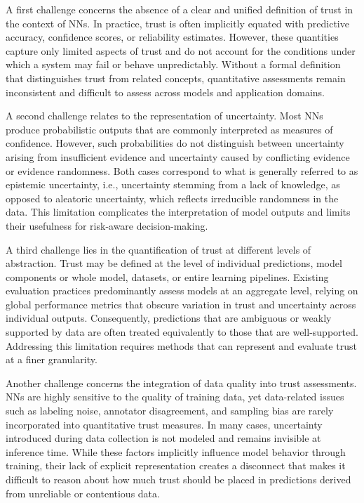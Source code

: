 A first challenge concerns the absence of a clear and unified definition of trust in the context of \acp{NN}. In practice, trust is often implicitly equated with predictive accuracy, confidence scores, or reliability estimates. However, these quantities capture only limited aspects of trust and do not account for the conditions under which a system may fail or behave unpredictably. Without a formal definition that distinguishes trust from related concepts, quantitative assessments remain inconsistent and difficult to assess across models and application domains.

A second challenge relates to the representation of uncertainty. Most \acp{NN} produce probabilistic outputs that are commonly interpreted as measures of confidence. However, such probabilities do not distinguish between uncertainty arising from insufficient evidence and uncertainty caused by conflicting evidence or evidence randomness. Both cases correspond to what is generally referred to as epistemic uncertainty, i.e., uncertainty stemming from a lack of knowledge, as opposed to aleatoric uncertainty, which reflects irreducible randomness in the data. This limitation complicates the interpretation of model outputs and limits their usefulness for risk-aware decision-making.

A third challenge lies in the quantification of trust at different levels of abstraction. Trust may be defined at the level of individual predictions, model components or whole model, datasets, or entire learning pipelines. Existing evaluation practices predominantly assess models at an aggregate level, relying on global performance metrics that obscure variation in trust and uncertainty across individual outputs. Consequently, predictions that are ambiguous or weakly supported by data are often treated equivalently to those that are well-supported. Addressing this limitation requires methods that can represent and evaluate trust at a finer granularity.

Another challenge concerns the integration of data quality into trust assessments. \acp{NN} are highly sensitive to the quality of training data, yet data-related issues such as labeling noise, annotator disagreement, and sampling bias are rarely incorporated into quantitative trust measures. In many cases, uncertainty introduced during data collection is not modeled and remains invisible at inference time. While these factors implicitly influence model behavior through training, their lack of explicit representation creates a disconnect that makes it difficult to reason about how much trust should be placed in predictions derived from unreliable or contentious data.

